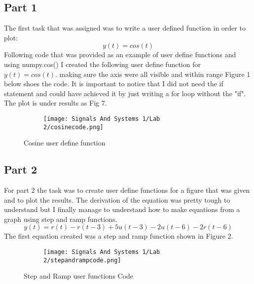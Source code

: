 \documentclass[12pt,a4paper]{article}
\begin{document}
\subsection{Part 1}
The first task that was assigned was to write a user defined function in order to plot: \[y(t)=cos(t)\] 
Following code that was provided as an example of user define functions and using numpy.cos() I created the following user define function for $y(t)=cos(t).$ making sure the axis were all visible and within range Figure 1 below shoes the code. It is important to notice that I did not need the if statement and could have achieved it by just writing a for loop without the "if". The plot is under results as Fig 7.



\begin{figure}[h]
\begin{subfigure}{ 1\textwidth}
\texttt{[image: Signals And Systems 1/Lab 2/cosinecode.png]}
\end{subfigure}
\caption{Cosine user define function }
\label{fig:image2}
\end{figure}





\subsection{Part 2}
For part 2 the task was to create user define functions for a figure that was given and to plot the results. The derivation of the equation was pretty tough to understand but I finally manage to understand how to make equations from a graph using step and ramp functions. \[y(t)=r(t)-r(t-3)+5u(t-3)-2u(t-6)-2r(t-6)\] 
The first equation created was a step and ramp function shown in Figure 2. 


\begin{figure}[h]
\begin{subfigure}{ 1\textwidth}
\texttt{[image: Signals And Systems 1/Lab 2/stepandrampcode.png]}
\end{subfigure}
\caption{Step and Ramp user functions Code}
\label{fig:image2}
\end{figure}
\end{document}
